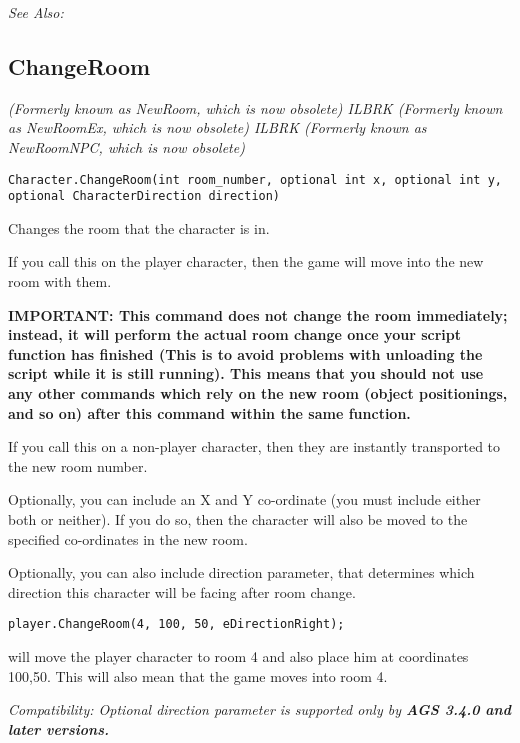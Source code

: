 \it{See Also:} 



\subsection{ChangeRoom}\label{Character.ChangeRoom}%

\it{(Formerly known as NewRoom, which is now obsolete)} ILBRK
\it{(Formerly known as NewRoomEx, which is now obsolete)} ILBRK
\it{(Formerly known as NewRoomNPC, which is now obsolete)}

\begin{verbatim}
Character.ChangeRoom(int room_number, optional int x, optional int y, optional CharacterDirection direction)
\end{verbatim}

Changes the room that the character is in.

If you call this on the player character, then the game will move into the new
room with them.

\bf{IMPORTANT:} This command does not change the room immediately; instead, it
will perform the actual room change once your script function has finished
(This is to avoid problems with unloading the script while it is still
running). This means that you should not use any other commands which rely
on the new room (object positionings, and so on) after this command within
the same function.

If you call this on a non-player character, then they are instantly transported
to the new room number.

Optionally, you can include an X and Y co-ordinate (you must include either both
or neither). If you do so, then the character will also be moved to the specified
co-ordinates in the new room.

Optionally, you can also include direction parameter, that determines which
direction this character will be facing after room change.

\begin{verbatim}
player.ChangeRoom(4, 100, 50, eDirectionRight);
\end{verbatim}
will move the player character to room 4 and also place him at coordinates 100,50.
This will also mean that the game moves into room 4.

\it{Compatibility:} Optional \it{direction} parameter is supported only by \bf{AGS 3.4.0} and later versions.

